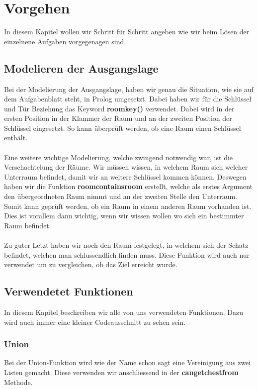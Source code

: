 \chapter{Vorgehen}
In diesem Kapitel wollen wir Schritt für Schritt
angeben wie wir beim Lösen der einzelnene
Aufgaben vorgegenagen sind.

\section{Modelieren der Ausgangslage}
Bei der Modelierung der Ausgangslage, haben wir genau
die Situation, wie sie auf dem Aufgabenblatt steht,
in Prolog umgesetzt. Dabei haben wir für die 
Schlüssel und Tür Beziehung das Keyword
\textbf{roomkey()} verwendet. Dabei wird in der 
ersten Position in der Klammer der Raum und an der
zweiten Position der Schlüssel eingesetzt. So kann überprüft 
werden, ob eine Raum einen Schlüssel enthält.\\
\\

\noindent
Eine weitere wichtige Modelierung, welche zwingend notwendig
war, ist die Verschachtelung der Räume. Wir müssen wissen,
in welchem Raum sich welcher Unterraum befindet, damit wir an 
weitere Schlüssel kommen können. Deswegen haben wir die 
Funktion \textbf{roomcontainsroom} erstellt, welche als erstes
Argument den übergeordneten Raum nimmt und an der zweiten Stelle
den Unterraum. Somit kann geprüft werden, ob ein Raum in einem 
anderen Raum vorhanden ist. Dies ist vorallem dann wichtig, wenn
wir wissen wollen wo sich ein bestimmter Raum befindet.\\
\\

\noindent
Zu guter Letzt haben wir noch den Raum festgelegt, in welchem sich 
der Schatz befindet, welchen man schlussendlich finden muss. Diese
Funktion wird auch nur verwendet um zu vergleichen, ob das Ziel 
erreicht wurde.

\section{Verwendetet Funktionen}
In diesem Kapitel beschreiben wir alle von uns verwendeten Funktionen.
Dazu wird auch immer eine kleiner Codeausschnitt zu sehen sein.

\subsection{Union}
Bei der Union-Funktion wird wie der Name schon sagt eine Vereinigung
aus zwei Listen gemacht. Diese verwenden wir anschliessend in der 
\textbf{cangetchestfrom} Methode.

